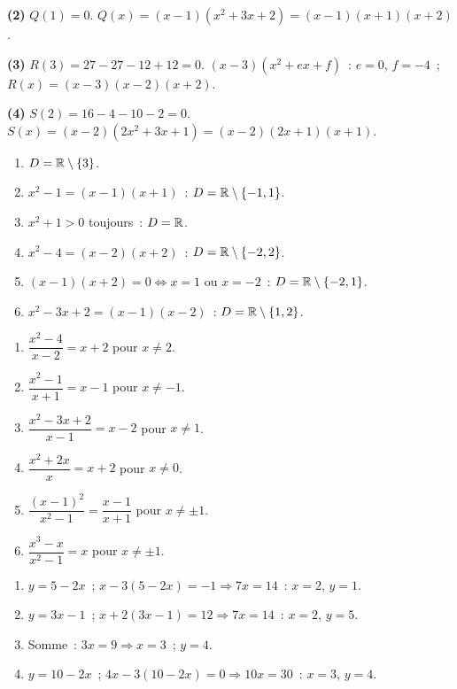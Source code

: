 \textbf{(2)} $Q(1)=0$.\checkmark\quad
$Q(x)=(x-1)(x^2+3x+2)=(x-1)(x+1)(x+2)$.

\textbf{(3)} $R(3)=27-27-12+12=0$.\checkmark\quad
$(x-3)(x^2+ex+f)$~: $e=0$, $f=-4$~; $R(x)=(x-3)(x-2)(x+2)$.

\textbf{(4)} $S(2)=16-4-10-2=0$.\checkmark\quad
$S(x)=(x-2)(2x^2+3x+1)=(x-2)(2x+1)(x+1)$.


\begin{enumerate}
  \item $D=\mathbb{R}\setminus\{3\}$.
  \item $x^2-1=(x-1)(x+1)$~: $D=\mathbb{R}\setminus\{-1,1\}$.
  \item $x^2+1>0$ toujours~: $D=\mathbb{R}$.
  \item $x^2-4=(x-2)(x+2)$~: $D=\mathbb{R}\setminus\{-2,2\}$.
  \item $(x-1)(x+2)=0\Leftrightarrow x=1$ ou $x=-2$~: $D=\mathbb{R}\setminus\{-2,1\}$.
  \item $x^2-3x+2=(x-1)(x-2)$~: $D=\mathbb{R}\setminus\{1,2\}$.
\end{enumerate}


\begin{enumerate}
  \item $\dfrac{x^2-4}{x-2}=x+2$ pour $x\ne2$.
  \item $\dfrac{x^2-1}{x+1}=x-1$ pour $x\ne-1$.
  \item $\dfrac{x^2-3x+2}{x-1}=x-2$ pour $x\ne1$.
  \item $\dfrac{x^2+2x}{x}=x+2$ pour $x\ne0$.
  \item $\dfrac{(x-1)^2}{x^2-1}=\dfrac{x-1}{x+1}$ pour $x\ne\pm1$.
  \item $\dfrac{x^3-x}{x^2-1}=x$ pour $x\ne\pm1$.
\end{enumerate}


\begin{enumerate}
  \item $y=5-2x$~; $x-3(5-2x)=-1\Rightarrow7x=14$~: $x=2$, $y=1$.
  \item $y=3x-1$~; $x+2(3x-1)=12\Rightarrow7x=14$~: $x=2$, $y=5$.
  \item Somme~: $3x=9\Rightarrow x=3$~; $y=4$.
  \item $y=10-2x$~; $4x-3(10-2x)=0\Rightarrow10x=30$~: $x=3$, $y=4$.
\end{enumerate}

